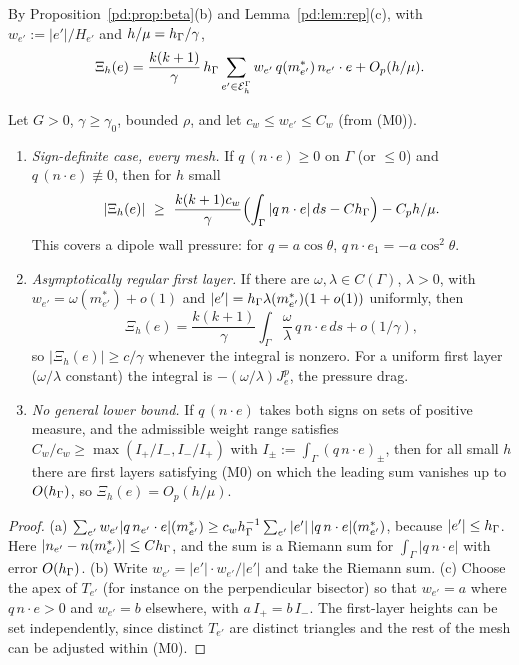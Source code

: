By Proposition~\ref{pd:prop:beta}(b) and Lemma~\ref{pd:lem:rep}(c), with $w_{e'}:=|e'|/H_{e'}$ and $h/\mu=h_\Gamma/\gamma$,
\[
\Xi_h(e)=\frac{k(k+1)}{\gamma}\,h_\Gamma\sum_{e'\in\mathcal E_h^\Gamma}w_{e'}\,q(m^\ast_{e'})\,n_{e'}\cdot e+O_p(h/\mu).
\]
\begin{proposition}\label{pd:prop:D}
Let $G>0$, $\gamma\ge\gamma_0$, bounded $\rho$, and let $c_w\le w_{e'}\le C_w$ (from (M0)).
\begin{enumerate}[label=(\alph*)]
\item \emph{Sign-definite case, every mesh.} If $q\,(n\cdot e)\ge0$ on $\Gamma$ (or $\le0$) and $q\,(n\cdot e)\not\equiv0$, then for $h$ small
\[
|\Xi_h(e)|\ \ge\ \frac{k(k+1)c_w}{\gamma}\Bigl(\int_\Gamma|q\,n\cdot e|\,ds-C\hG\Bigr)-C_ph/\mu .
\]
This covers a dipole wall pressure: for $q=a\cos\theta$, $q\,n\cdot e_1=-a\cos^2\theta$.
\item \emph{Asymptotically regular first layer.} If there are $\omega,\lambda\in C(\Gamma)$, $\lambda>0$, with $w_{e'}=\omega(m^\ast_{e'})+o(1)$ and $|e'|=h_\Gamma\lambda(m^\ast_{e'})(1+o(1))$ uniformly, then
\[
\Xi_h(e)=\frac{k(k+1)}{\gamma}\int_\Gamma\frac\omega\lambda\,q\,n\cdot e\,ds+o(1/\gamma),
\]
so $|\Xi_h(e)|\ge c/\gamma$ whenever the integral is nonzero. For a uniform first layer ($\omega/\lambda$ constant) the integral is $-(\omega/\lambda)J^p_e$, the pressure drag.
\item \emph{No general lower bound.} If $q\,(n\cdot e)$ takes both signs on sets of positive measure, and the admissible weight range satisfies $C_w/c_w\ge\max(I_+/I_-,I_-/I_+)$ with $I_\pm:=\int_\Gamma(q\,n\cdot e)_\pm$, then for all small $h$ there are first layers satisfying (M0) on which the leading sum vanishes up to $O(h_\Gamma)$, so $\Xi_h(e)=O_p(h/\mu)$.
\end{enumerate}
\end{proposition}

\begin{proof}
(a) $\sum_{e'}w_{e'}|q\,n_{e'}\cdot e|(m^\ast_{e'})\ge c_wh_\Gamma^{-1}\sum_{e'}|e'|\,|q\,n\cdot e|(m^\ast_{e'})$, because $|e'|\le h_\Gamma$. Here $|n_{e'}-n(m^\ast_{e'})|\le Ch_\Gamma$, and the sum is a Riemann sum for $\int_\Gamma|q\,n\cdot e|$ with error $O(h_\Gamma)$. (b) Write $w_{e'}=|e'|\cdot w_{e'}/|e'|$ and take the Riemann sum. (c) Choose the apex of $T_{e'}$ (for instance on the perpendicular bisector) so that $w_{e'}=a$ where $q\,n\cdot e>0$ and $w_{e'}=b$ elsewhere, with $a\,I_+=b\,I_-$. The first-layer heights can be set independently, since distinct $T_{e'}$ are distinct triangles and the rest of the mesh can be adjusted within (M0).
\end{proof}

